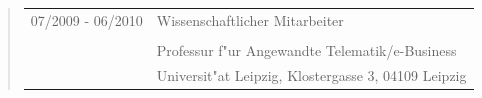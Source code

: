 	\begin{quote}
		\begin{tabular}{p{4cm}l}
			07/2009 - 06/2010&Wissenschaftlicher Mitarbeiter\\\\
			&Professur f"ur Angewandte Telematik/e-Business\\   
			&Universit"at Leipzig, Klostergasse 3, 04109 Leipzig
			\end{tabular}
		\end{quote}
